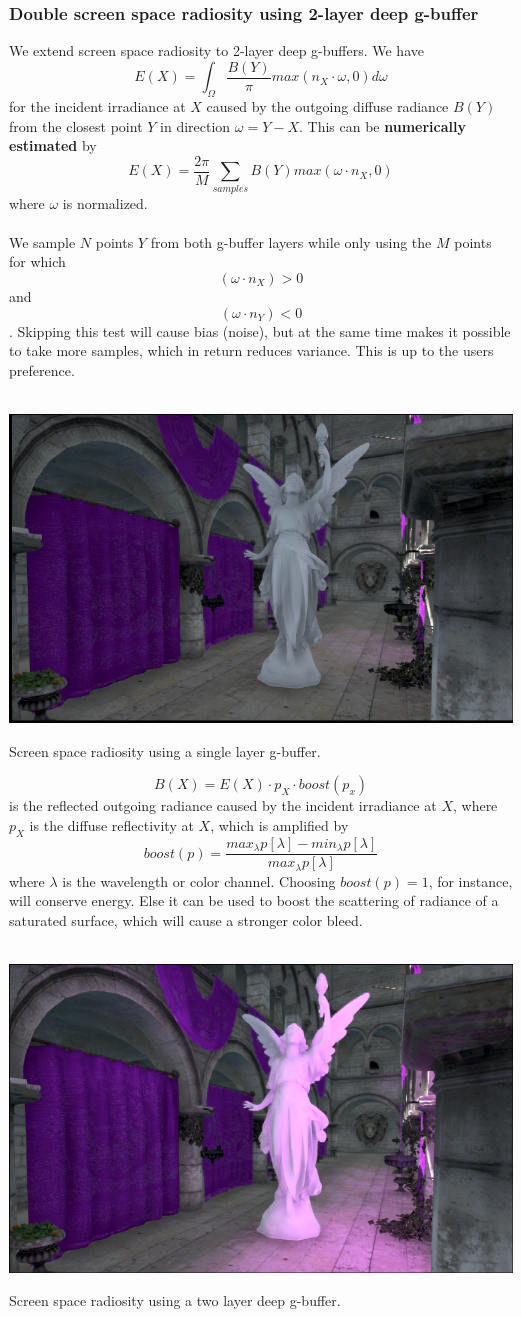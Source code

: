 \documentclass{ACGSeminar}
\begin{document}
	\subsubsection{Double screen space radiosity using 2-layer deep g-buffer}
		We extend screen space radiosity \cite{RTAII} to 2-layer deep g-buffers. We have 
		$$ E(X) = \int_{\Omega} \frac{B(Y)}{\pi} max(n_X \cdot \omega, 0) d\omega$$
		for the incident irradiance at $X$ caused by the outgoing diffuse radiance $B(Y)$ from the closest point $Y$ in direction $\omega = Y - X$. This can be \textbf{numerically estimated} by
		$$ E(X) = \frac{2\pi}{M} \sum_{samples} B(Y) max(\omega \cdot n_X, 0)$$
		where $\omega$ is normalized. \\\\
		We sample $N$ points $Y$ from both g-buffer layers while only using the $M$ points for which
		$$ (\omega \cdot n_X) > 0 $$
		and
		$$ (\omega \cdot n_Y) < 0 $$. Skipping this test will cause bias (noise), but at the same time makes it possible to take more samples, which in return reduces variance. This is up to the users preference. \\\\
		\begin{floatingfigure}[r]{.5\textwidth}%
			\includegraphics[width=.5\textwidth]{img/radiosity_one.png}
			\caption{Screen space radiosity using a single layer g-buffer.}%
			\label{fig:radiosity_one}%
		\end{floatingfigure}%
		$$ B(X) = E(X) \cdot p_X \cdot boost(p_x) $$
		is the reflected outgoing radiance caused by the incident irradiance at $X$, where $p_X$ is the diffuse reflectivity at $X$, which is amplified by 
		$$ boost(p) = \frac{max_{\lambda}p[\lambda] - min_{\lambda}p[\lambda]}{max_{\lambda}p[\lambda]} $$ 
		where $\lambda$ is the wavelength or color channel. Choosing $boost(p) = 1$, for instance, will conserve energy. Else it can be used to boost the scattering of radiance of a saturated surface, which will cause a stronger color bleed. \\\\
		\begin{floatingfigure}[r]{.5\textwidth}%
			\includegraphics[width=.5\textwidth]{img/radiosity_two.png}
			\caption{Screen space radiosity using a two layer deep g-buffer.}%
			\label{fig:radiosity_two}%
		\end{floatingfigure}%
\end{document}
